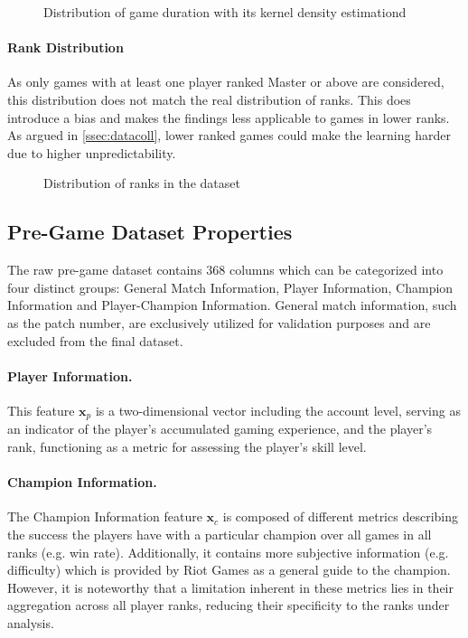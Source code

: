 \documentclass[12pt, a4paper, headinclude, twoside, plainheadsepline, open=right, numbers=noenddot, hidelinks, toc=listof, toc=bibliography]{scrreprt}
\begin{document}
\begin{figure}[ht]

\caption{Distribution of game duration with its kernel density estimationd}
\label{fig:gameDuration}
\end{figure}


\paragraph{Rank Distribution}
As only games with at least one player ranked Master or above are considered, this distribution does not match the real distribution of ranks.
This does introduce a bias and makes the findings less applicable to games in lower ranks.
As argued in \ref{ssec:datacoll}, lower ranked games could make the learning harder due to higher unpredictability.

\begin{figure}
\centering
\resizebox{\textwidth}{!}
{

}
\caption{Distribution of ranks in the dataset}
\label{fig:tier}
\end{figure}

\subsection{Pre-Game Dataset Properties}
\label{ssec:dataprop}

The raw pre-game dataset contains $368$ columns which can be categorized into four distinct groups: General Match Information, Player Information, Champion Information and Player-Champion Information.
General match information, such as the patch number, are exclusively utilized for validation purposes and are excluded from the final dataset.

\paragraph{Player Information.}
This feature $\mathbf{x}_p$ is a two-dimensional vector including the account level, serving as an indicator of the player's accumulated gaming experience, and the player's rank, functioning as a metric for assessing the player's skill level.

\paragraph{Champion Information.}
The Champion Information feature $\mathbf{x}_c$ is composed of different metrics describing the success the players have with a particular champion over all games in all ranks (e.g. win rate).
Additionally, it contains more subjective information (e.g. difficulty) which is provided by Riot Games as a general guide to the champion.
However, it is noteworthy that a limitation inherent in these metrics lies in their aggregation across all player ranks, reducing their specificity to the ranks under analysis.
\end{document}
